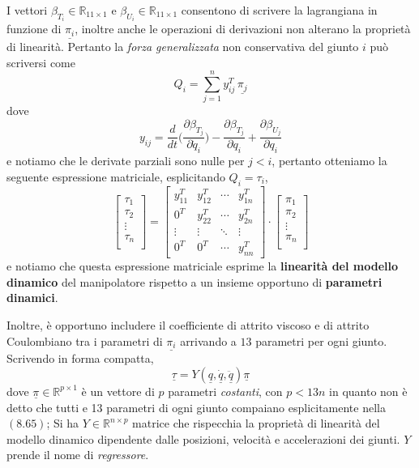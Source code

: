 I vettori $\beta_{T_i} \in \mathbb{R}_{11 \times 1}$ e $\beta_{U_i} \in \mathbb{R}_{11 \times 1}$ consentono di scrivere la lagrangiana in funzione di $\underline{\pi_i}$, inoltre anche le operazioni di derivazioni non alterano la proprietà di linearità. Pertanto la \emph{forza generalizzata} non conservativa del giunto $i$ può scriversi come
\begin{equation}
	Q_i = \sum_{j=1}^n y_{ij}^T \, \underline{\pi_j}
\end{equation}
dove 
\begin{equation}
	y_{ij} = \frac{d}{dt} \Biggl( \frac{\partial \beta_{T_j}}{\partial \dot{q}_i} \Biggr) - \frac{\partial \beta_{T_j}}{\partial q_i} + \frac{\partial \beta_{U_j}}{\partial q_i}
\end{equation}
e notiamo che le derivate parziali sono nulle per $j<i$, pertanto otteniamo la seguente espressione matriciale, esplicitando $Q_i = \tau_i$,
\begin{equation}
	\begin{bmatrix}
		\tau_1 \\
		\tau_2 \\
		\vdots \\
		\tau_n \\
	\end{bmatrix}
	= 
	\begin{bmatrix}
		y_{11}^T & y_{12}^T & \cdots & y_{1n}^T \\
		0^T & y_{22}^T & \cdots & y_{2n}^T \\
		\vdots & \vdots & \ddots & \vdots \\
		0^T & 0^T & \cdots & y_{nn}^T
	\end{bmatrix}
		\cdot
	\begin{bmatrix}
		\pi_1 \\
		\pi_2 \\
		\vdots \\
		\pi_n \\
	\end{bmatrix}
\end{equation}
e notiamo che questa espressione matriciale esprime la \textbf{linearità del modello dinamico} del manipolatore rispetto a un insieme opportuno di \textbf{parametri dinamici}.

Inoltre, è opportuno includere il coefficiente di attrito viscoso e di attrito Coulombiano tra i parametri di $\underline{\pi_i}$ arrivando a $13$ parametri per ogni giunto. Scrivendo in forma compatta,
\begin{equation}
	\underline{\tau} = Y(\underline{q}, \underline{\dot{q}}, \underline{\ddot{q}}) \underline{\pi}
\end{equation}
dove $\underline{\pi} \in \mathbb{R}^{p \times 1}$ è un vettore di $p$ parametri \emph{costanti}, con $p < 13n$ in quanto non è detto che tutti e 13 parametri di ogni giunto compaiano esplicitamente nella $(8.65)$; Si ha $Y \in \mathbb{R}^{n \times p}$ matrice che rispecchia la proprietà di linearità del modello dinamico dipendente dalle posizioni, velocità e accelerazioni dei giunti. $Y$ prende il nome di \emph{regressore}. 

